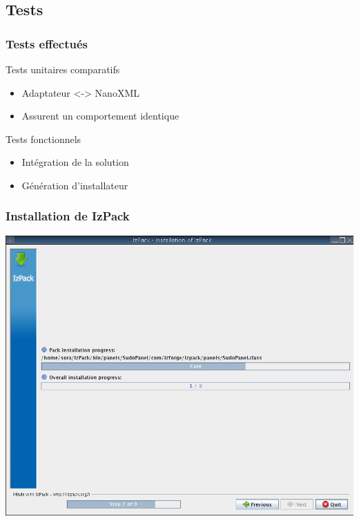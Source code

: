 \subsection{Tests}
\begin{frame}\frametitle{Tests effectués}
\begin{minipage}[c]{.9\linewidth}
	\begin{beamerboxesrounded}[shadow=true]{Tests unitaires comparatifs}
		\begin{itemize}
			\item Adaptateur <-> NanoXML
			\item Assurent un comportement identique
		\end{itemize}
	\end{beamerboxesrounded}
\end{minipage}
\vfill
\begin{minipage}[c]{.9\linewidth}
	\begin{beamerboxesrounded}[shadow=true]{Tests fonctionnels}
		\begin{itemize}
			\item Intégration de la solution
			\item Génération d'installateur
		\end{itemize}
	\end{beamerboxesrounded}
\end{minipage}
\end{frame}
\begin{frame}\frametitle{Installation de IzPack}
	\centering
	\includegraphics[width=\linewidth]{../image/installationIzpack.png}
\end{frame}

